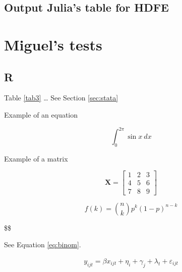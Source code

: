 \documentclass[
  12pt,
]{article}
\begin{document}
\hypertarget{output-julias-table-for-hdfe}{%
\subsection{Output Julia's table for HDFE}\label{output-julias-table-for-hdfe}}

\begin{table}[ht]
\label{tab:hdfe}
  
\end{table}

\hypertarget{miguels-tests}{%
\section{Miguel's tests}\label{miguels-tests}}

\hypertarget{r}{%
\subsection{R}\label{r}}

Table \ref{tab3} \ldots{} See Section \ref{sec:stata}

Example of an equation

\[\int_0^{2\pi} \sin x~dx\]

Example of a matrix

\[\mathbf{X} = \left[\begin{array}
{rrr}
1 & 2 & 3 \\
4 & 5 & 6 \\
7 & 8 & 9
\end{array}\right]
\]

\begin{equation}
f\left(k\right)=\binom{n}{k}p^k\left(1-p\right)^{n-k} \label{eq:binom}
\end{equation}

\$\$

See Equation \eqref{eq:binom}.

\begin{align}
y_{ijt} = \beta x_{ijt} + \eta_i + \gamma_j + \lambda_t + \varepsilon_{ijt}
\end{align}
\end{document}
